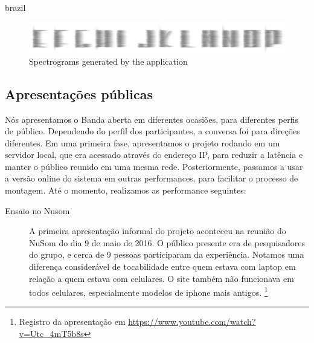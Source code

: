 \begin{otherlanguage*}{brazil}
\begin{figure}[!ht]
    \centering
        \includegraphics[width=1\textwidth]{pictures/spectrogram}
        \vspace{-10pt}
    \caption{Spectrograms generated by the application}
    \vspace{-10pt}
    \label{fig:spectro}
\end{figure}







\subsection{Apresentações públicas}
Nós apresentamos o Banda aberta em diferentes ocasiões, para diferentes perfis de público. Dependendo do perfil dos participantes, a conversa foi para direções diferentes. Em uma primeira fase, apresentamos o projeto rodando em um servidor local, que era acessado através do endereço IP, para reduzir a latência e manter o público reunido em uma mesma rede. Posteriormente, passamos a usar a versão online do sistema em outras performances, para facilitar o processo de montagem. Até o momento, realizamos as performance seguintes:

\begin{description}

\item[Ensaio no Nusom] 
A primeira apresentação informal do projeto aconteceu na reunião do NuSom do dia 9 de maio de 2016. O público presente era de pesquisadores do grupo, e cerca de 9 pessoas participaram da experiência. Notamos uma diferença considerável de tocabilidade entre quem estava com laptop em relação a quem estava com celulares. O site também não funcionava em todos celulares, especialmente modelos de iphone mais antigos. \footnote{Registro da apresentação em \url{https://www.youtube.com/watch?v=Utc_4mT5b8s}}


\end{description}
\end{otherlanguage*}

